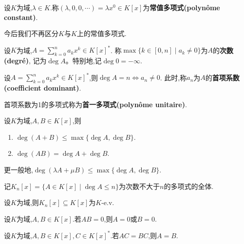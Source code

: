 \begin{deff}
    设$K$为域,$\lambda \in K$.称$(\lambda, 0, 0, \cdots) = \lambda x^0 \in K[x]$为\textbf{常值多项式(polynôme constant)}.

    今后我们不再区分$K$与$K$上的常值多项式.
\end{deff}

\begin{deff}
    设$K$为域,$A = \sum\limits_{k = 0} ^ n a_k x ^ k \in K[x]^*$.
    称$\max \{ k \in [0, n] \mid a_k \neq 0\}$为$A$的\textbf{次数(degré)},
    记为$\deg A$。特别地,记$\deg 0 = - \infty$.
\end{deff}

\begin{rqq}
    设$A = \sum\limits_{k=0}^n a_k x^k \in K[x]^*$,则$\deg A = n \iff a_n \neq 0$.
    此时,称$a_n$为$A$的\textbf{首项系数(coefficient dominant)}.
\end{rqq}

\begin{rqq}
    首项系数为1的多项式称为\textbf{首一多项式(polynôme unitaire)}.
\end{rqq}

\begin{prop}
    设$K$为域,$A, B \in K[x]$,则
    \begin{enumerate}
        \item $\deg (A + B) \leqslant \max \{ \deg A, \deg B \}$.
        \item $\deg (AB) = \deg A + \deg B$.
    \end{enumerate}
\end{prop}

\begin{rqq}
    更一般地,$\deg (\lambda A + \mu B) \leqslant \max \{ \deg A, \deg B \}$.
\end{rqq}

\begin{rqq}
    记$K_n[x] = \{ A \in K[x] \mid \deg A \leqslant n \}$为次数不大于$n$的多项式的全体.
\end{rqq}

\begin{prop}
    设$K$为域,则$K_n[x] \subseteq K[x]$为$K$-e.v.
\end{prop}

\begin{prop}
    设$K$为域,$A, B \in K[x]$.若$AB = 0$,则$A = 0$或$B = 0$.
\end{prop}

\begin{cor}
    设$K$为域,$A, B \in K[x], C \in K[x]^*$.若$AC = BC$,则$A = B$.
\end{cor}

